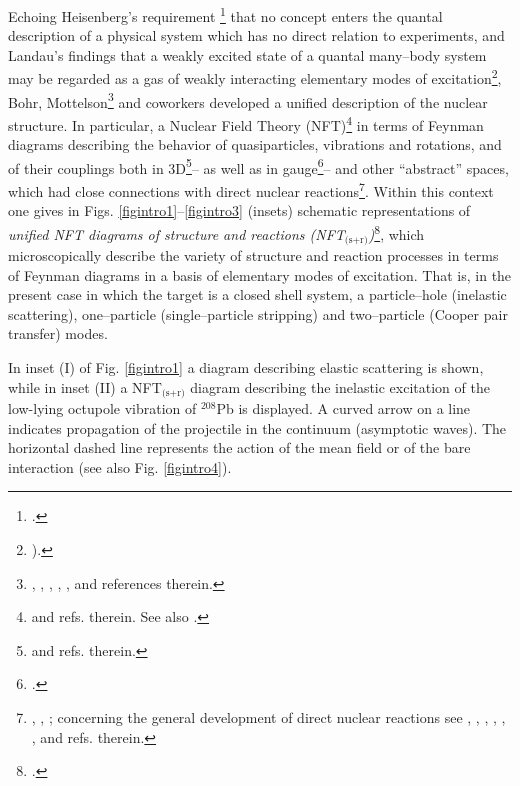 Echoing Heisenberg's requirement \footnote{\cite{Heisenberg:49}.} that no concept enters the quantal description of a physical system which has no direct relation to experiments, and Landau's findings that a weakly excited state of a quantal many--body system may be regarded as a gas of weakly interacting elementary modes of excitation\footnote{\cite{Landau:41}).}, Bohr, Mottelson\footnote{\cite{Bohr:64}, \cite{Bohr:69}, \cite{Bohr:76}, \cite{Mottelson:76}, \cite{Bohr:75}, \cite{Bohr:58} and references therein.} and coworkers developed a unified description of the nuclear  structure. In particular, a Nuclear Field Theory (NFT)\footnote{\cite{Bes:74,Broglia:76,Bohr:75,Bes:90,Mottelson:76} and refs. therein. See also \cite{Bohr:19}.} in terms of Feynman diagrams describing the behavior of quasiparticles, vibrations and rotations, and of their couplings both in 3D\footnote{\cite{Nilsson:55,Bohr:75} and refs. therein.}-- as well as in gauge\footnote{\cite{Bohr:58,Belyaev:59,Hogassen:61,Bes:66,Bjerregaard:66b,Broglia:67,Bohr:75}.}-- and other ``abstract'' spaces, which had  close connections with direct nuclear reactions\footnote{ \cite{Alder:56}, \cite{Alder:75}, \cite{Broglia:04a}; concerning the general development of direct nuclear reactions see \cite{Austern:70}, \cite{Jackson:70}, \cite{Satchler:80}, \cite{Satchler:83}, \cite{Brink:85}, \cite{Glendenning:04,Thompson:09}, and refs. therein.}. Within this context one gives in Figs. \ref{figintro1}--\ref{figintro3} (insets)  schematic representations of  \textit{unified NFT diagrams of structure and reactions (NFT$_{\text{(s+r)}}$)}\footnote{\cite{Broglia:75,Broglia:04a,Potel:13,Broglia:16}.}, which microscopically describe the variety of structure and reaction processes in terms of Feynman diagrams in a basis of elementary modes of excitation. That is, in the present case in which the target is a closed shell system, a particle--hole (inelastic scattering), one--particle (single--particle stripping) and two--particle (Cooper pair transfer) modes. 

In inset (I) of Fig. \ref{figintro1} a diagram describing elastic scattering is shown, while in inset (II) a NFT$_{\text{(s+r)}}$ diagram describing the inelastic excitation of the low-lying octupole vibration of $^{208}$Pb is displayed. A  curved arrow on a line indicates propagation of  the projectile in the continuum  (asymptotic waves). The horizontal dashed line represents the action of the mean field or of the  bare interaction (see also Fig. \ref{figintro4}). 


